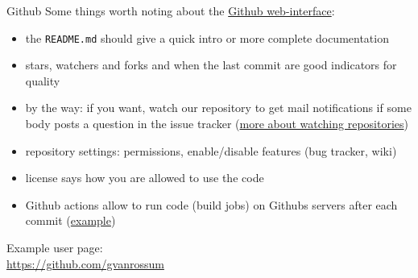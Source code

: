 \begin{frame}[fragile]{Github}
    Some things worth noting about the
    \href{https://github.com/inwe-boku/lecture-scientific-computing/}{Github web-interface}:
    \begin{itemize}
        \item the \verb|README.md| should give a quick intro or more complete documentation
        \item stars, watchers and forks and when the last commit are good indicators for quality
        \item by the way: if you want, watch our repository to get mail notifications if some body
            posts a question in the issue tracker
            (\href{https://help.github.com/en/github/receiving-notifications-about-activity-on-github/about-notifications}{more about watching repositories})
        \item repository settings: permissions, enable/disable features (bug tracker, wiki)
        \item license says how you are allowed to use the code
        \item Github actions allow to run code (build jobs) on Githubs servers after each commit
            (\href{https://github.com/inwe-boku/lecture-scientific-computing/actions/runs/57614853}{example})
    \end{itemize}

    \pause
    \bigskip
    Example user page:\\
    \href{https://github.com/gvanrossum}{https://github.com/gvanrossum}
\end{frame}


